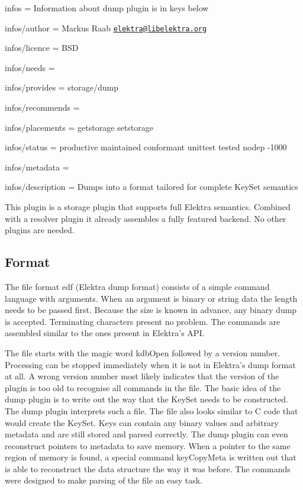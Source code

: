 
\begin{DoxyItemize}
\item infos = Information about dump plugin is in keys below
\item infos/author = Markus Raab \href{mailto:elektra@libelektra.org}{\tt elektra@libelektra.\+org}
\item infos/licence = B\+SD
\item infos/needs =
\item infos/provides = storage/dump
\item infos/recommends =
\item infos/placements = getstorage setstorage
\item infos/status = productive maintained conformant unittest tested nodep -\/1000
\item infos/metadata =
\item infos/description = Dumps into a format tailored for complete Key\+Set semantics
\end{DoxyItemize}

This plugin is a storage plugin that supports full Elektra semantics. Combined with a resolver plugin it already assembles a fully featured backend. No other plugins are needed.

\subsection*{Format}

The file format edf (Elektra dump format) consists of a simple command language with arguments. When an argument is binary or string data the length needs to be passed first. Because the size is known in advance, any binary dump is accepted. Terminating characters present no problem. The commands are assembled similar to the ones present in Elektra’s A\+PI.

The file starts with the magic word {\ttfamily kdb\+Open} followed by a version number. Processing can be stopped immediately when it is not in Elektra’s dump format at all. A wrong version number most likely indicates that the version of the plugin is too old to recognise all commands in the file. The basic idea of the dump plugin is to write out the way that the Key\+Set needs to be constructed. The dump plugin interprets such a file. The file also looks similar to C code that would create the Key\+Set. Keys can contain any binary values and arbitrary metadata and are still stored and parsed correctly. The dump plugin can even reconstruct pointers to metadata to save memory. When a pointer to the same region of memory is found, a special command {\ttfamily key\+Copy\+Meta} is written out that is able to reconstruct the data structure the way it was before. The commands were designed to make parsing of the file an easy task.


